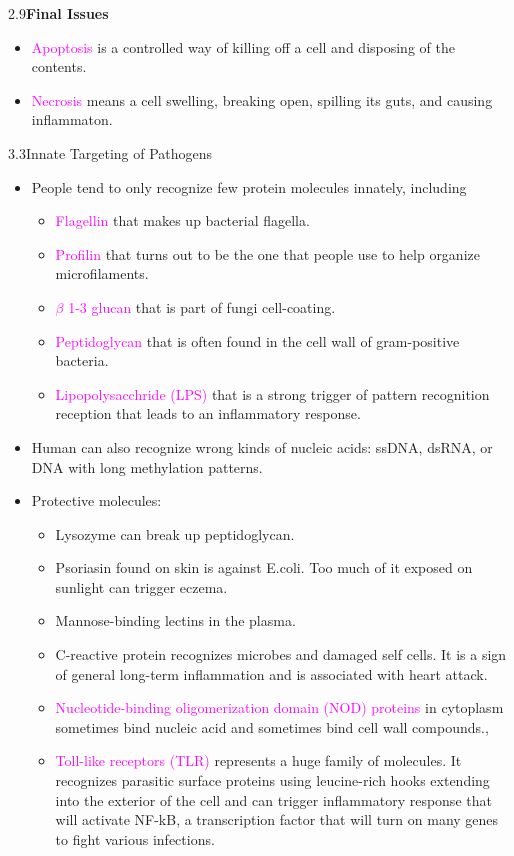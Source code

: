 \documentclass[UTF8]{book}
\newcommand{\concept}[1]{\textcolor{magenta}{#1}}
\begin{document}
2.9\quad \textbf{Final Issues}
\begin{itemize}
\item \concept{Apoptosis} is a controlled way of killing off a cell and disposing of the contents.
\item \concept{Necrosis} means a cell swelling, breaking open, spilling its guts, and causing inflammaton.
\end{itemize}
3.3\quad Innate Targeting of Pathogens
\begin{itemize}
\item People tend to only recognize few protein molecules innately, including 
\begin{itemize}
	\item \concept{Flagellin} that makes up bacterial flagella.
	\item \concept{Profilin} that turns out to be the one that people use to help organize microfilaments.
	\item \concept{$\beta$ 1-3 glucan} that is part of fungi cell-coating.
	\item \concept{Peptidoglycan} that is often found in the cell wall of gram-positive bacteria.
	\item \concept{Lipopolysacchride (LPS)} that is a strong trigger of pattern recognition reception that leads to an inflammatory response.
\end{itemize}
\item Human can also recognize wrong kinds of nucleic acids: ssDNA, dsRNA, or DNA with long methylation patterns.
\item Protective molecules:
\begin{itemize}
	\item Lysozyme can break up peptidoglycan.
	\item Psoriasin found on skin is against E.coli. Too much of it exposed on sunlight can trigger eczema.
	\item Mannose-binding lectins in the plasma.
	\item C-reactive protein recognizes microbes and damaged self cells. It is a sign of general long-term inflammation and is associated with heart attack.
	\item \concept{Nucleotide-binding oligomerization domain (NOD) proteins} in cytoplasm sometimes bind nucleic acid and sometimes bind cell wall compounds.,
	\item \concept{Toll-like receptors (TLR)} represents a huge family of molecules. It recognizes parasitic surface proteins using leucine-rich hooks extending into the exterior of the cell and can trigger inflammatory response that will activate NF-kB, a transcription factor that will turn on many genes to fight various infections.

\end{itemize}
\end{itemize}
\end{document}
